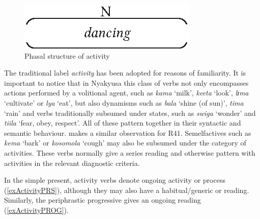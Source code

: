 \begin{figure}[h]
\begin{center}
\includegraphics{figures/GrafikActivity.eps}
\end{center}
\caption{Phasal structure of activity}
\label{FigureActivity}
\end{figure}
The traditional label \textit{activity} has been adopted for reasons of familiarity. It is important to notice that in Nyakyusa this class of verbs not only encompasses actions performed by a volitional agent, such as \textit{kama} `milk', \textit{keeta} `look', \textit{lɪma} `cultivate' or \textit{lya} `eat', but also dynamisms such as \textit{bala} `shine (of sun)', \textit{tima} `rain' and verbs traditionally subsumed under states, such as \textit{swiga} `wonder' and \textit{tiila} `fear, obey, respect'. All of these pattern together in their syntactic and semantic behaviour. \citet[271f]{SeidelF2008} makes a similar observation for  R41.  Semelfactives such as \textit{kema} \lq bark' or \textit{kosomola} \lq cough' may also be subsumed under the category of activities. These verbs normally give a series reading and otherwise pattern with activities in the relevant diagnostic criteria.
 
In the simple present, activity verbs denote ongoing activity or process (\ref{exActivityPRS}), although they may also have a habitual/generic or  reading. Similarly, the periphrastic progressive gives an ongoing reading (\ref{exActivityPROG}).

